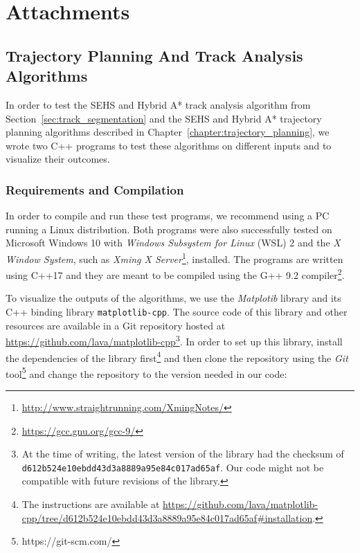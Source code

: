 \chapter{Attachments}
\label{chapter:user_documentation}


\section{Trajectory Planning And Track Analysis Algorithms}

In order to test the \gls{SEHS} and Hybrid A* track analysis algorithm from Section~\ref{sec:track_segmentation} and the \gls{SEHS} and Hybrid A* trajectory planning algorithms described in Chapter~\ref{chapter:trajectory_planning}, we wrote two C++ programs to test these algorithms on different inputs and to visualize their outcomes.

\subsection{Requirements and Compilation}

In order to compile and run these test programs, we recommend using a PC running a Linux distribution. Both programs were also successfully tested on Microsoft Windows 10 with \textit{Windows Subsystem for Linux} (WSL) 2 and the \textit{X Window System}, such as \textit{Xming X Server}\footnote{\url{http://www.straightrunning.com/XmingNotes/}}, installed. The programs are written using C++17 and they are meant to be compiled using the G++ 9.2 compiler\footnote{\url{https://gcc.gnu.org/gcc-9/}}.

To visualize the outputs of the algorithms, we use the \textit{Matplotib} library and its C++ binding library \texttt{matplotlib-cpp}. The source code of this library and other resources are available in a Git repository hosted at \url{https://github.com/lava/matplotlib-cpp}\footnote{At the time of writing, the latest version of the library had the checksum of \texttt{d612b524e10ebdd43d3a8889a95e84c017ad65af}. Our code might not be compatible with future revisions of the library.}. In order to set up this library, install the dependencies of the library first\footnote{The instructions are available at \url{https://github.com/lava/matplotlib-cpp/tree/d612b524e10ebdd43d3a8889a95e84c017ad65af#installation}.} and then clone the repository using the \textit{Git} tool\footnote{https://git-scm.com/} and change the repository to the version needed in our code:

